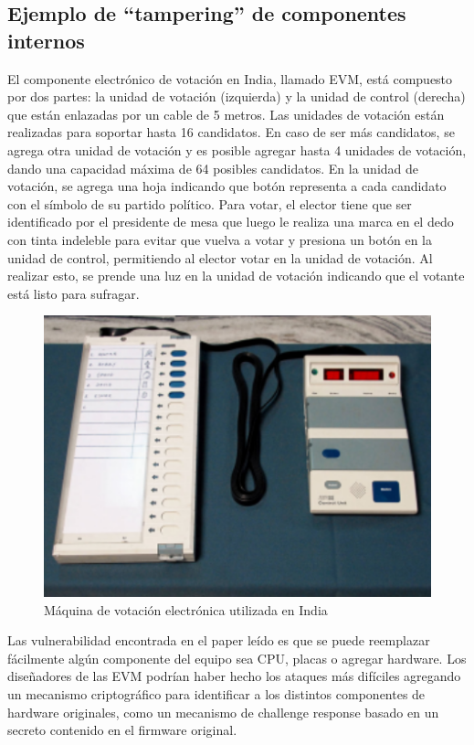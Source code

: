 \subsection{Ejemplo de ``tampering'' de componentes internos}

El componente electrónico de votación en India, llamado EVM, está compuesto por dos partes: la unidad de votación (izquierda) y la unidad de control (derecha) que están enlazadas por un cable de 5 metros. Las unidades de votación están realizadas para soportar hasta 16 candidatos. En caso de ser más candidatos, se agrega otra unidad de votación y es posible agregar hasta 4 unidades de votación, dando una capacidad máxima de 64 posibles candidatos. En la unidad de votación, se agrega una hoja indicando que botón representa a cada candidato con el símbolo de su partido político. Para votar, el elector tiene que ser identificado por el presidente de mesa que luego le realiza una marca en el dedo con tinta indeleble para evitar que vuelva a votar y presiona un botón en la unidad de control, permitiendo al elector votar en la unidad de votación. Al realizar esto, se prende una luz en la unidad de votación indicando que el votante está listo para sufragar.

\begin{figure}[h]
\includegraphics{Imagenes/almacenamiento1}
\caption{Máquina de votación electrónica utilizada en India}
\end{figure}

Las vulnerabilidad encontrada en el paper leído es que se puede reemplazar fácilmente algún componente del equipo sea CPU, placas o agregar hardware\cite{india}. Los diseñadores de las EVM podrían haber hecho los ataques más difíciles agregando un mecanismo criptográfico para identificar a los distintos componentes de hardware originales, como un mecanismo de challenge response basado en un secreto contenido en el firmware original.

